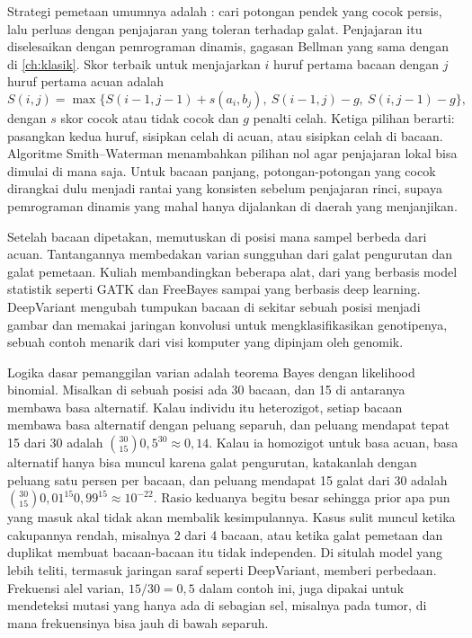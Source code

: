 Strategi pemetaan umumnya adalah : cari potongan pendek yang cocok persis, lalu perluas dengan
penjajaran yang toleran terhadap galat. Penjajaran itu diselesaikan dengan pemrograman dinamis, gagasan Bellman yang
sama dengan di \cref{ch:klasik}. Skor terbaik untuk menjajarkan $i$ huruf pertama bacaan dengan $j$ huruf pertama acuan
adalah
\begin{equation}
S(i,j)=\max\big\{S(i-1,j-1)+s(a_i,b_j),\ S(i-1,j)-g,\ S(i,j-1)-g\big\},
\end{equation}
dengan $s$ skor cocok atau tidak cocok dan $g$ penalti celah. Ketiga pilihan berarti: pasangkan kedua huruf, sisipkan
celah di acuan, atau sisipkan celah di bacaan. Algoritme Smith--Waterman menambahkan pilihan nol agar penjajaran lokal
bisa dimulai di mana saja. Untuk bacaan panjang, potongan-potongan yang cocok dirangkai dulu menjadi rantai yang konsisten
sebelum penjajaran rinci, supaya pemrograman dinamis yang mahal hanya dijalankan di daerah yang menjanjikan.

Setelah bacaan dipetakan,  memutuskan di posisi mana sampel berbeda dari acuan. Tantangannya
membedakan varian sungguhan dari galat pengurutan dan galat pemetaan. Kuliah membandingkan beberapa alat, dari yang
berbasis model statistik seperti GATK dan FreeBayes sampai yang berbasis deep learning. DeepVariant \citep{poplin2018}
mengubah tumpukan bacaan di sekitar sebuah posisi menjadi gambar dan memakai jaringan konvolusi untuk mengklasifikasikan
genotipenya, sebuah contoh menarik dari visi komputer yang dipinjam oleh genomik.

Logika dasar pemanggilan varian adalah teorema Bayes dengan likelihood binomial. Misalkan di sebuah posisi ada 30 bacaan, dan 15 di
antaranya membawa basa alternatif. Kalau individu itu heterozigot, setiap bacaan membawa basa alternatif dengan peluang separuh, dan
peluang mendapat tepat 15 dari 30 adalah $\binom{30}{15}0{,}5^{30}\approx0{,}14$. Kalau ia homozigot untuk basa acuan, basa alternatif
hanya bisa muncul karena galat pengurutan, katakanlah dengan peluang satu persen per bacaan, dan peluang mendapat 15 galat dari 30 adalah
$\binom{30}{15}0{,}01^{15}0{,}99^{15}\approx10^{-22}$. Rasio keduanya begitu besar sehingga prior apa pun yang masuk akal tidak akan
membalik kesimpulannya. Kasus sulit muncul ketika cakupannya rendah, misalnya 2 dari 4 bacaan, atau ketika galat pemetaan dan duplikat
membuat bacaan-bacaan itu tidak independen. Di situlah model yang lebih teliti, termasuk jaringan saraf seperti DeepVariant, memberi
perbedaan. Frekuensi alel varian, $15/30=0{,}5$ dalam contoh ini, juga dipakai untuk mendeteksi mutasi yang hanya ada di sebagian sel,
misalnya pada tumor, di mana frekuensinya bisa jauh di bawah separuh.

